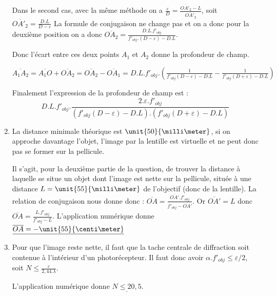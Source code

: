 \documentclass[10pt,a4paper]{article}
\begin{document}
\begin{enumerate}
Dans le second cas, avec la même méthode on a $\frac{\varepsilon}{D}=\frac{\overline{OA'_2}-L}{\overline{OA'_2}}$, soit 
$\overline{OA'_2}=\frac{D.L}{D-\varepsilon}$ La formule de conjugaison ne change pas et on a donc pour la deuxième position
on a donc $\overline{OA_2}=\frac{D.L.f'_{obj}}{f'_{obj}.(D-\varepsilon)-D.L}$.
\smallskip

Donc l'écart entre ces deux points $A_1$ et $A_2$ donne la profondeur de champ. 

$\overline{A_1A_2}=\overline{A_1O}+\overline{OA_2}=\overline{OA_2}-\overline{OA_1}=
D.L.f'_{obj}.(\frac{1}{f'_{obj}(D-\varepsilon)-D.L}-\frac{1}{f'_{obj}(D+\varepsilon)-D.L})$

Finalement l'expression de la profondeur de champ est :
 $$\boxed{D.L.f'_{obj}.\frac{2.\varepsilon.f'_{obj}}{(f'_{obj}(D-\varepsilon)-D.L).(f'_{obj}(D+\varepsilon)-D.L)}}$$

\item La distance minimale théorique est $\unit{50}{\milli\meter}$, si on approche davantage l'objet, l'image par la lentille est virtuelle et ne peut donc
pas se former sur la pellicule.

Il s'agit, pour la deuxième partie de la question, de trouver la distance à laquelle se situe un objet dont l'image est nette sur la pellicule, située à une
distance $L=\unit{55}{\milli\meter}$ de l'objectif (donc de la lentille).
La relation de conjugaison nous donne donc : $\overline{OA}=\frac{\overline{OA'}.f'_{obj}}{f'_{obj}-\overline{OA'}}$. Or $\overline{OA'}=L$ donc 
$\boxed{\overline{OA}=\frac{L.f'_{obj}}{f'_{obj}-L}}$. L'application numérique donne $\underline{\overline{OA}=-\unit{55}{\centi\meter}}$
\item Pour que l'image reste nette, il faut que la tache centrale de diffraction soit contenue à l'intérieur d'un photorécepteur. Il faut donc avoir
$\alpha.f'_{obj}\leqslant \varepsilon/2$, soit $\boxed{N\leqslant \frac{\varepsilon}{2,44.\lambda}}$.

L'application numérique donne $\underline{N\leqslant 20,5}$.
\end{enumerate}
\end{document}
